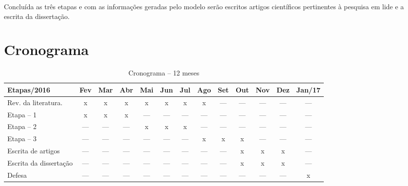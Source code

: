 Concluída as três etapas e com as informações geradas pelo modelo serão escritos artigos científicos  pertinentes à pesquisa em lide e a escrita da dissertação.
 
 
 
\pagebreak 
 
\section{Cronograma}\label{intro:cronograma}


\begin{table}[htbp]
 \scriptsize
      \centering  \caption{Cronograma -- 12 meses}
	\begin{tabular}{l|c|c|c|c|c|c|c|c|c|c|c|c}
	\hline
	\textbf{Etapas/2016} & \textbf{Fev} & \textbf{Mar} & \textbf{Abr} & \textbf{Mai}& \textbf{Jun} & \textbf{Jul} & \textbf{Ago} & \textbf{Set} & \textbf{Out} & \textbf{Nov} & \textbf{Dez} & \textbf{Jan/17} \\
	  \hline
	  Rev. da literatura. & x & x & x & x & x & x & x & --- & --- & --- & --- & --- \\ \hline
	  Etapa -- 1 & x & x & x & --- & --- & --- & --- & --- & --- & --- & --- & --- \\ \hline
	  Etapa -- 2 & --- & --- & --- & x & x & x & --- & --- & --- & --- & --- & --- \\ \hline
	  Etapa -- 3 & --- & --- & --- & --- & --- & --- & x & x & x & --- & --- & --- \\ \hline
	  Escrita de artigos & --- & --- & --- & --- & --- & --- & --- & --- & x & x & x & --- \\ \hline
	  Escrita da dissertação & --- & --- & --- & --- & --- & --- & --- & --- & x & x & x & --- \\ \hline
	  Defesa & --- & --- & --- & --- & --- & --- & --- & --- & --- & --- & --- & x \\ \hline
	\end{tabular}
\end{table}


 




